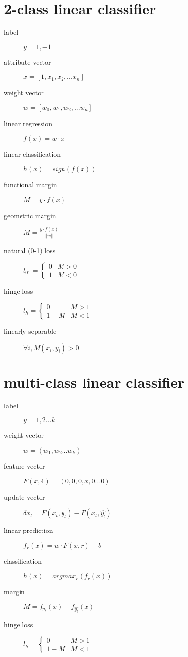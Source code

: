 \documentclass[12pt]{article}
\begin{document}
\begin{multicols}{2}

  \section{2-class linear classifier}
  \begin{description}
  \item[label] $y = 1, -1$
  \item[attribute vector] $x = [1, x_1, x_2, ... x_n]$
  \item[weight vector] $w = [w_0, w_1, w_2, ... w_n]$
  \item[linear regression] $f(x) = w \cdot x$
  \item[linear classification] $h(x) = sign(f(x))$
  \item[functional margin] $M = y \cdot f(x)$
  \item[geometric margin] $M = \frac{y \cdot f(x)}{||w||}$
  \item[natural (0-1) loss]
    $l_{01} =
    \begin{cases}
      0 & M > 0 \\
      1 & M < 0
    \end{cases}$
  \item[hinge loss]
    $l_{h} =
    \begin{cases}
      0 & M > 1 \\
      1 - M & M < 1
    \end{cases}$
    \item[linearly separable] $\forall i, M(x_i, y_i) > 0$
  \end{description}

  \section{multi-class linear classifier}
  \begin{description}
  \item[label] $y = 1, 2...k$
  \item[weight vector] $w = (w_1, w_2...w_k)$
  \item[feature vector] $F(x,4) = (0,0,0,x,0...0)$
  \item[update vector] $\delta x_t = F(x_t,y_t) - F(x_t,\hat{y_t})$
  \item[linear prediction] $f_r(x) = w \cdot F(x,r) + b$
  \item[classification] $h(x) = argmax_r(f_r(x))$
  \item[margin] $M = f_{y_t}(x) - f_{\hat{y_t}}(x)$
  \item[hinge loss]
    $l_{h} =
    \begin{cases}
      0 & M > 1 \\
      1 - M & M < 1
    \end{cases}$
  \end{description}


\end{multicols}
\end{document}
